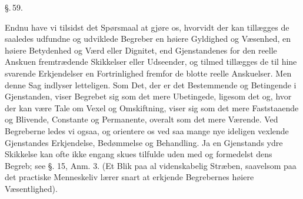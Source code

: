 \documentclass[12pt]{book}
\def\textit#1{#1}%
\def\emph#1{#1}%
\newcommand{\parag}[1]{%
  \par\vspace{0.9\baselineskip}%
  {\centering\textit{\S.\,#1.}\par}%
  \vspace{0.35\baselineskip}%
  \noindent\hspace{\parindent}\ignorespaces
}
\begin{document}
\parag{59}

Endnu have vi tilsidst det Spørsmaal at gjøre os, hvorvidt der kan tillægges de
saaledes udfundne og udviklede Begreber en \emph{høiere Gyldighed og Væsenhed}, en
\emph{høiere} Betydenhed og Værd eller Dignitet, end Gjenstandenes for den reelle
Anskuen fremtrædende Skikkelser eller Udseender, og tilmed tillægges de til hine
svarende Erkjendelser en Fortrinlighed fremfor de blotte reelle Anskuelser. Men denne
Sag indlyser letteligen. Som Det, der er det Bestemmende og Betingende i Gjenstanden,
viser Begrebet sig som det mere \emph{Ubetingede}, ligesom det og, hvor der kan være
Tale om Vexel og Omskiftning, viser sig som det mere \emph{Faststaaende og Blivende,
Constante og Permanente}, overalt som det mere \emph{Værende}. Ved Begreberne ledes
vi ogsaa, og orientere os ved saa mange nye ideligen vexlende Gjenstandes
Erkjendelse, Bedømmelse og Behandling. Ja en Gjenstands ydre Skikkelse kan ofte ikke
engang skues tilfulde uden med og formedelst dens Begreb; see §. 15, Anm. 3. (Et Blik
paa al videnskabelig Stræben, saavelsom paa det practiske Menneskeliv lærer snart at
erkjende Begrebernes høiere Væsentlighed).
\end{document}
